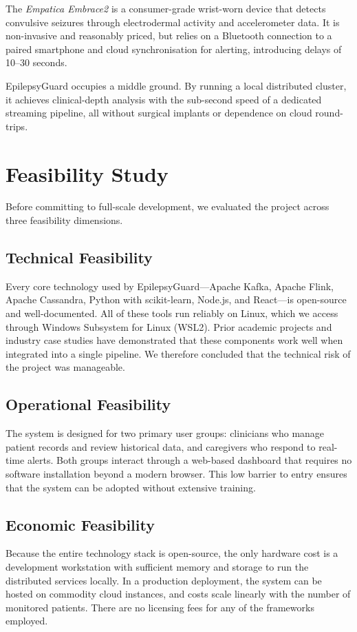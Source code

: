 \documentclass[12pt, a4paper, oneside]{report}
\begin{document}
The \textit{Empatica Embrace2} is a consumer-grade wrist-worn device that detects convulsive seizures through electrodermal activity and accelerometer data. It is non-invasive and reasonably priced, but relies on a Bluetooth connection to a paired smartphone and cloud synchronisation for alerting, introducing delays of 10--30 seconds.

EpilepsyGuard occupies a middle ground. By running a local distributed cluster, it achieves clinical-depth analysis with the sub-second speed of a dedicated streaming pipeline, all without surgical implants or dependence on cloud round-trips.

\section{Feasibility Study}
Before committing to full-scale development, we evaluated the project across three feasibility dimensions.

\subsection{Technical Feasibility}
Every core technology used by EpilepsyGuard---Apache Kafka, Apache Flink, Apache Cassandra, Python with scikit-learn, Node.js, and React---is open-source and well-documented. All of these tools run reliably on Linux, which we access through Windows Subsystem for Linux (WSL2). Prior academic projects and industry case studies have demonstrated that these components work well when integrated into a single pipeline. We therefore concluded that the technical risk of the project was manageable.

\subsection{Operational Feasibility}
The system is designed for two primary user groups: clinicians who manage patient records and review historical data, and caregivers who respond to real-time alerts. Both groups interact through a web-based dashboard that requires no software installation beyond a modern browser. This low barrier to entry ensures that the system can be adopted without extensive training.

\subsection{Economic Feasibility}
Because the entire technology stack is open-source, the only hardware cost is a development workstation with sufficient memory and storage to run the distributed services locally. In a production deployment, the system can be hosted on commodity cloud instances, and costs scale linearly with the number of monitored patients. There are no licensing fees for any of the frameworks employed.
\end{document}
